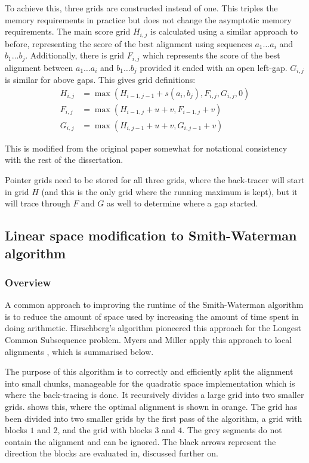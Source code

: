 To achieve this, three grids are constructed instead of one.
This triples the memory requirements in practice but does not change the asymptotic memory requirements.
The main score grid $H_{i,j}$ is calculated using a similar approach to before, representing the score of the best alignment using sequences $a_1\ldots a_i$ and $b_1 \ldots b_j$.
Additionally, there is grid $F_{i,j}$ which represents the score of the best alignment between $a_1\ldots a_i$ and $b_1 \ldots b_j$ provided it ended with an open left-gap.
$G_{i,j}$ is similar for above gaps.
This gives grid definitions:
\begin{align*}
H_{i,j} &= \max(H_{i-1,j-1} + s(a_i, b_j), F_{i,j}, G_{i,j}, 0) \\
F_{i,j} &= \max(H_{i-1,j} + u + v, F_{i-1,j} + v) \\
G_{i,j} &= \max(H_{i,j-1} + u + v, G_{i,j-1} + v)
\end{align*}

This is modified from the original paper somewhat for notational consistency with the rest of the dissertation.

Pointer grids need to be stored for all three grids, where the back-tracer will start in grid $H$ (and this is the only grid where the running maximum is kept), but it will trace through $F$ and $G$ as well to determine where a gap started.

\subsection{Linear space modification to Smith-Waterman algorithm}
\label{sec:SW_Linear_Prep}
\subsubsection{Overview}
\label{sec:SW_Linear_Overview}

A common approach to improving the runtime of the Smith-Waterman algorithm is to reduce the amount of space used by increasing the amount of time spent in doing arithmetic.
Hirschberg’s algorithm \cite{Hirschberg} pioneered this approach for the Longest Common Subsequence problem.
Myers and Miller apply this approach to local alignments \cite{MyersMiller}, which is summarised below.

The purpose of this algorithm is to correctly and efficiently split the alignment into small chunks, manageable for the quadratic space implementation which is where the back-tracing is done.
It recursively divides a large grid into two smaller grids.
 shows this, where the optimal alignment is shown in orange.
The grid has been divided into two smaller grids by the first pass of the algorithm, a grid with blocks $1$ and $2$, and the grid with blocks $3$ and $4$.
The grey segments do not contain the alignment and can be ignored.
The black arrows represent the direction the blocks are evaluated in, discussed further on.

